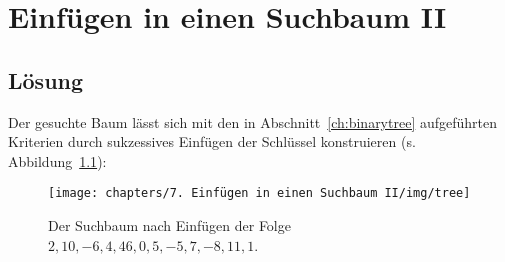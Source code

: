 \chapter{Einfügen in einen Suchbaum II}

\section*{Lösung}

Der gesuchte Baum lässt sich mit den in Abschnitt~\ref{ch:binarytree} aufgeführten Kriterien durch sukzessives Einfügen der Schlüssel konstruieren (s. Abbildung~\ref{fig:tree}):


\begin{figure}[h]

    \texttt{[image: chapters/7. Einfügen in einen Suchbaum II/img/tree]}
    \caption{Der Suchbaum nach Einfügen der Folge $2, 10, -6, 4, 46, 0, 5, -5, 7, -8, 11, 1$.}

    \label{fig:tree}
\end{figure}

